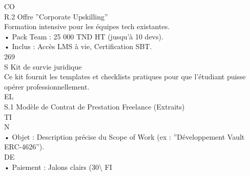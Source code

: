 CO\\
R.2    Offre ”Corporate Upskilling”\\
Formation intensive pour les équipes tech existantes.\\
\vspace{0.5em}
• Pack Team : 25 000 TND HT (jusqu’à 10 devs).\\
\vspace{0.5em}
• Inclus : Accès LMS à vie, Certification SBT.\\
\vspace{0.5em}
\vspace{0.5em}
\vspace{0.5em}
\vspace{0.5em}
269\\
S \textbar{} Kit de survie juridique\\
\vspace{0.5em}
\vspace{0.5em}
Ce kit fournit les templates et checklists pratiques pour que l’étudiant puisse opérer professionnellement.\\
\vspace{0.5em}
\vspace{0.5em}
\vspace{0.5em}
\vspace{0.5em}
EL\\
S.1 Modèle de Contrat de Prestation Freelance (Extraits)\\
\vspace{0.5em}
\vspace{0.5em}
\vspace{0.5em}
\vspace{0.5em}
TI\\
N\\
• Objet : Description précise du Scope of Work (ex : ”Développement Vault ERC-4626”).\\
\vspace{0.5em}
\vspace{0.5em}
\vspace{0.5em}
\vspace{0.5em}
DE\\
• Paiement : Jalons clairs (30\textbackslash{}%
\vspace{0.5em}
\vspace{0.5em}
\vspace{0.5em}
\vspace{0.5em}
FI\\
